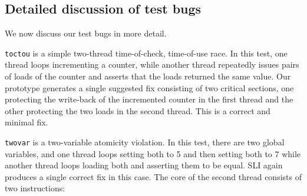 \documentclass[10pt,letter,twocolumn]{sigplanconf}
\newcommand{\editorial}[1]{}
\begin{document}



\subsection{Detailed discussion of test bugs}
\label{sect:bug_descr}

We now discuss our test bugs in more detail.

\verb|toctou| is a simple two-thread time-of-check, time-of-use race.
In this test, one thread loops incrementing a counter, while another
thread repeatedly issues pairs of loads of the counter and asserts
that the loads returned the same value.  Our prototype generates a
single suggested fix consisting of two critical sections, one
protecting the write-back of the incremented counter in the first
thread and the other protecting the two loads in the second thread.
This is a correct and minimal fix.

\verb|twovar| is a two-variable atomicity violation.  In this test,
there are two global variables, and one thread loops setting both to 5
and then setting both to 7 while another thread loops loading both and
asserting them to be equal.  SLI again produces a single correct fix
in this case.  The core of the second thread consists of two
instructions:
\end{document}
